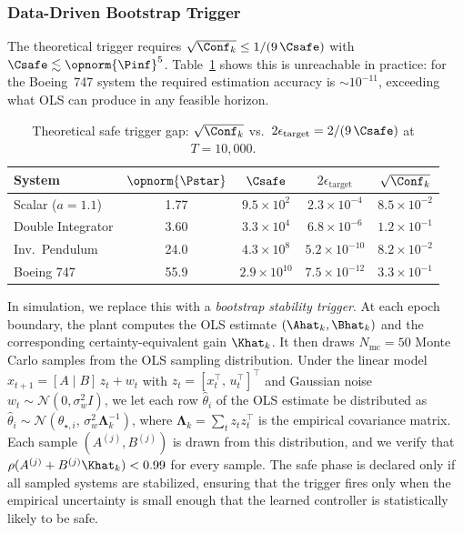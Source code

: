 \documentclass[11pt,journal,onecolumn]{IEEEtran}
\begin{document}
\subsubsection{Data-Driven Bootstrap Trigger}

The theoretical trigger requires $\sqrt{\Conf_k} \le 1/(9\,\Csafe)$ with $\Csafe \lesssim \opnorm{\Pinf}^5$. Table~\ref{tab:trigger} shows this is unreachable in practice: for the Boeing~747 system the required estimation accuracy is $\sim 10^{-11}$, exceeding what OLS can produce in any feasible horizon.

\begin{table}[h]
\centering
\caption{Theoretical safe trigger gap: $\sqrt{\Conf_k}$ vs.\ $2\epsilon_{\mathrm{target}} = 2/(9\,\Csafe)$ at $T=10{,}000$.}
\label{tab:trigger}
\begin{tabular}{lcccc}
\hline
System & $\opnorm{\Pstar}$ & $\Csafe$ & $2\epsilon_{\mathrm{target}}$ & $\sqrt{\Conf_k}$ \\
\hline
Scalar ($a\!=\!1.1$) & 1.77 & $9.5\!\times\!10^{2}$ & $2.3\!\times\!10^{-4}$ & $8.5\!\times\!10^{-2}$ \\
Double Integrator & 3.60 & $3.3\!\times\!10^{4}$ & $6.8\!\times\!10^{-6}$ & $1.2\!\times\!10^{-1}$ \\
Inv.\ Pendulum & 24.0 & $4.3\!\times\!10^{8}$ & $5.2\!\times\!10^{-10}$ & $8.2\!\times\!10^{-2}$ \\
Boeing 747 & 55.9 & $2.9\!\times\!10^{10}$ & $7.5\!\times\!10^{-12}$ & $3.3\!\times\!10^{-1}$ \\
\hline
\end{tabular}
\end{table}

In simulation, we replace this with a \emph{bootstrap stability trigger}. At each epoch boundary, the plant computes the OLS estimate $(\Ahat_k, \Bhat_k)$ and the corresponding certainty-equivalent gain $\Khat_k$. It then draws $N_{\mathrm{mc}} = 50$ Monte Carlo samples from the OLS sampling distribution. Under the linear model $x_{t+1} = [A \mid B]\,z_t + w_t$ with $z_t = [x_t^\top,\, u_t^\top]^\top$ and Gaussian noise $w_t \sim \mathcal{N}(0, \sigma_w^2 I)$, we let each row $\hat\theta_i$ of the OLS estimate be distributed as $\hat\theta_i \sim \mathcal{N}(\theta_{\star,i},\, \sigma_w^2 \mathbf{\Lambda}_k^{-1})$, where $\mathbf{\Lambda}_k = \sum_t z_t z_t^\top$ is the empirical covariance matrix. Each sample $(A^{(j)}, B^{(j)})$ is drawn from this distribution, and we verify that $\rho(A^{(j)} + B^{(j)} \Khat_k) < 0.99$ for every sample. The safe phase is declared only if all sampled systems are stabilized, ensuring that the trigger fires only when the empirical uncertainty is small enough that the learned controller is statistically likely to be safe.
\end{document}
